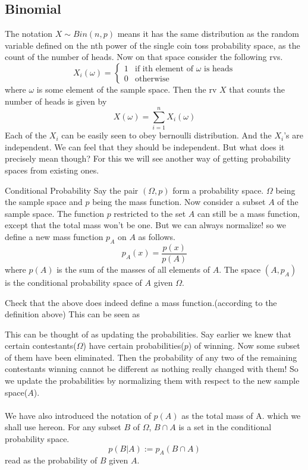 \documentclass{myclass}
\begin{document}
\subsection*{Binomial}
The notation $X\sim Bin(n,p)$ means it has the same distribution as the random variable defined on the nth power of the single coin toss probability space, as the count of the number of heads.
Now on that space consider the following rvs.
$$X_i(\omega)=\begin{cases}
    1 & \text{if ith element of }\omega\text{ is heads}\\
    0 & \text{otherwise}
\end{cases}$$
where $\omega$ is some element of the sample space. Then the rv $X$ that counts the number of heads is given by $$X(\omega)=\sum_{i=1}^n X_i(\omega)$$
Each of the $X_i$ can be easily seen to obey bernoulli distribution. And the $X_i$'s are independent. We can feel that they should be independent. But what does it precisely mean though? For this we will see another way of getting probability spaces from existing ones.
\begin{bluthm}{Conditional Probability}
    Say the pair $(\Omega,p)$ form a probability space. $\Omega$ being the sample space and $p$ being the mass function. Now consider a subset $A$ of the sample space. The function $p$ restricted to the set $A$ can still be a mass function, except that the total mass won't be one.
    But we can always normalize! so we define a new mass function $p_A$ on $A$ as follows.
    $$p_A(x)=\frac{p(x)}{p(A)}$$
    where $p(A)$ is the sum of the masses of all elements of $A$. The space $(A,p_A)$ is the conditional probability space of $A$ given $\Omega$.
\end{bluthm}
\begin{exe}
Check that the above does indeed define a mass function.(according to the definition above)
This can be seen as 
\end{exe}

This can be thought of as updating the probabilities. Say earlier we knew that certain contestants($\Omega$) have certain probabilities($p$) of winning. Now some subset of them have been eliminated. Then the  probability
of any two of the remaining contestants winning cannot be different as nothing really changed with them! So we update the probabilities by normalizing them with respect to the new sample space($A$).
\\ \\
We have also introduced the notation of $p(A)$ as the total mass of A. which we shall use hereon. For any subset $B$ of $\Omega$, $B\cap A$ is a set in the conditional probability space. $$p(B|A):=p_A(B\cap A)$$
read as the probability of $B$ given $A$. 
\end{document}
